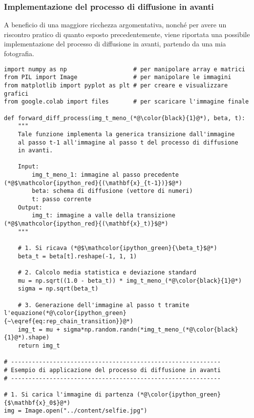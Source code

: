 \subsubsection{Implementazione del processo di diffusione in avanti}

A beneficio di una maggiore ricchezza argomentativa, nonché per avere un riscontro pratico di 
quanto esposto precedentemente, viene riportata una possibile implementazione del processo di 
diffusione in avanti, partendo da una mia fotografia.

\begin{lstlisting}[language=iPython, caption=Codice adattato da~\cite{nain2022} e implementato con Google Colab~\cite{GoogleColaboratory},label=lst:diff]
import numpy as np                   # per manipolare array e matrici 
from PIL import Image                # per manipolare le immagini  
from matplotlib import pyplot as plt # per creare e visualizzare grafici 
from google.colab import files       # per scaricare l'immagine finale
  
def forward_diff_process(img_t_meno_(*@\color{black}{1}@*), beta, t):
    """
    Tale funzione implementa la generica transizione dall'immagine
    al passo t-1 all'immagine al passo t del processo di diffusione
    in avanti.

    Input:
        img_t_meno_1: immagine al passo precedente (*@$\mathcolor{ipython_red}{(\mathbf{x}_{t-1})}$@*)
        beta: schema di diffusione (vettore di numeri)
        t: passo corrente 
    Output:
        img_t: immagine a valle della transizione (*@$\mathcolor{ipython_red}{(\mathbf{x}_t)}$@*)
    """

    # 1. Si ricava (*@$\mathcolor{ipython_green}{\beta_t}$@*)
    beta_t = beta[t].reshape(-1, 1, 1)  

    # 2. Calcolo media statistica e deviazione standard
    mu = np.sqrt((1.0 - beta_t)) * img_t_meno_(*@\color{black}{1}@*)
    sigma = np.sqrt(beta_t)

    # 3. Generazione dell'immagine al passo t tramite l'equazione(*@\color{ipython_green}{~\eqref{eq:rep_chain_transition}}@*)
    img_t = mu + sigma*np.random.randn(*img_t_meno_(*@\color{black}{1}@*).shape)
    return img_t  

# ------------------------------------------------------------
# Esempio di applicazione del processo di diffusione in avanti  
# ------------------------------------------------------------

# 1. Si carica l'immagine di partenza (*@\color{ipython_green}{$\mathbf{x}_0$}@*)
img = Image.open("../content/selfie.jpg")


\end{lstlisting}
